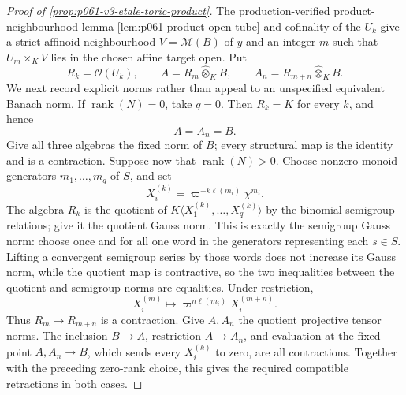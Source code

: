 \begin{proof}[Proof of \cref{prop:p061-v3-etale-toric-product}]
The production-verified product-neighbourhood lemma
\cref{lem:p061-product-open-tube} and cofinality of the \(U_k\) give a
strict affinoid neighbourhood \(V=\mathcal M(B)\) of \(y\) and an
integer \(m\) such that \(U_m\times_KV\) lies in the chosen affine target
open. Put
\[
 R_k=\mathcal O(U_k),
 \qquad A=R_m\widehat\otimes_KB,
 \qquad A_n=R_{m+n}\widehat\otimes_KB.
\]
We next record explicit norms rather than appeal to an unspecified
equivalent Banach norm. If \(\operatorname{rank}(N)=0\), take \(q=0\).
Then \(R_k=K\) for every \(k\), and hence
\[
                         A=A_n=B.
\]
Give all three algebras the fixed norm of \(B\); every structural map is the
identity and is a contraction. Suppose now that
\(\operatorname{rank}(N)>0\). Choose nonzero monoid generators
\(m_1,\ldots,m_q\) of \(S\), and set
\[
 X_i^{(k)}=\varpi^{-k\ell(m_i)}\chi^{m_i}.
\]
The algebra \(R_k\) is the quotient of
\(K\langle X_1^{(k)},\ldots,X_q^{(k)}\rangle\) by the binomial semigroup
relations; give it the quotient Gauss norm. This is exactly the semigroup
Gauss norm: choose once and for all one word in the generators representing
each \(s\in S\). Lifting a convergent semigroup series by those words does
not increase its Gauss norm, while the quotient map is contractive, so the
two inequalities between the quotient and semigroup norms are equalities.
Under restriction,
\begin{equation}\label{eq:p061-v3-normalized-restriction}
 X_i^{(m)}\longmapsto
 \varpi^{n\ell(m_i)}X_i^{(m+n)}.
\end{equation}
Thus \(R_m\to R_{m+n}\) is a contraction. Give \(A,A_n\) the quotient
projective tensor norms. The inclusion \(B\to A\), restriction
\(A\to A_n\), and evaluation at the fixed point
\(A,A_n\to B\), which sends every \(X_i^{(k)}\) to zero, are all
contractions. Together with the preceding zero-rank choice, this gives the
required compatible retractions in both cases.


\end{proof}
